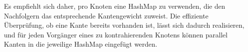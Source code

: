 Es empfiehlt sich daher, pro Knoten eine HashMap zu verwenden, die den Nachfolgern das entsprechende Kantengewicht zuweist.
Die effiziente Überprüfung, ob eine Kante bereits vorhanden ist, lässt sich dadurch realisieren, und für jeden Vorgänger eines zu kontrahierenden Knotens können parallel Kanten in die jeweilige HashMap eingefügt werden.
